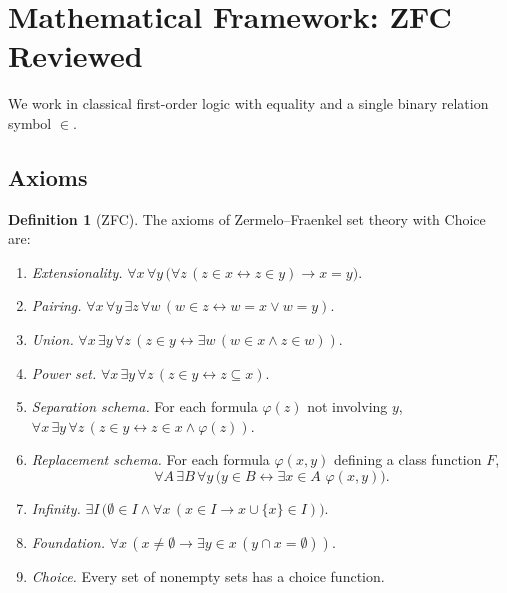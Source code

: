 \documentclass[12pt]{article}
\theoremstyle{definition}
\newtheorem{definition}[theorem]{Definition}
\theoremstyle{remark}
\begin{document}
\section{Mathematical Framework: ZFC Reviewed}
\label{sec:zfc}

We work in classical first-order logic with equality and a single binary
relation symbol $\in$.

\subsection{Axioms}

\begin{definition}[ZFC]\label{def:zfc}
The axioms of Zermelo--Fraenkel set theory with Choice are:

\begin{enumerate}
\item[\textbf{(Ext)}] \emph{Extensionality.}
$\forall x\, \forall y\, \bigl(\forall z\,(z \in x \leftrightarrow z \in y) \to x = y\bigr)$.

\item[\textbf{(Pair)}] \emph{Pairing.}
$\forall x\, \forall y\, \exists z\, \forall w\,(w \in z \leftrightarrow w = x \vee w = y)$.

\item[\textbf{(Un)}] \emph{Union.}
$\forall x\, \exists y\, \forall z\,(z \in y \leftrightarrow \exists w\,(w \in x \wedge z \in w))$.

\item[\textbf{(Pow)}] \emph{Power set.}
$\forall x\, \exists y\, \forall z\,(z \in y \leftrightarrow z \subseteq x)$.

\item[\textbf{(Sep)}] \emph{Separation schema.} For each formula $\varphi(z)$
not involving $y$,
$\forall x\, \exists y\, \forall z\,(z \in y \leftrightarrow z \in x \wedge \varphi(z))$.

\item[\textbf{(Repl)}] \emph{Replacement schema.} For each formula
$\varphi(x,y)$ defining a class function $F$,
\[
\forall A\, \exists B\, \forall y\,
   \bigl(y \in B \leftrightarrow \exists x \in A\,\, \varphi(x,y)\bigr).
\]

\item[\textbf{(Inf)}] \emph{Infinity.}
$\exists I\,\bigl(\emptyset \in I \wedge \forall x\,(x \in I \to x \cup \{x\} \in I)\bigr)$.

\item[\textbf{(Found)}] \emph{Foundation.}
$\forall x\,(x \neq \emptyset \to \exists y \in x\,(y \cap x = \emptyset))$.

\item[\textbf{(AC)}] \emph{Choice.} Every set of nonempty sets has a choice
function.
\end{enumerate}
\end{definition}
\end{document}
